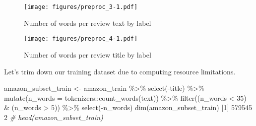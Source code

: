 \documentclass[
]{article}
\newenvironment{Shaded}{}{}
\newcommand{\AttributeTok}[1]{\textcolor[rgb]{0.49,0.56,0.16}{#1}}
\newcommand{\CommentTok}[1]{\textcolor[rgb]{0.38,0.63,0.69}{\textit{#1}}}
\newcommand{\DecValTok}[1]{\textcolor[rgb]{0.25,0.63,0.44}{#1}}
\newcommand{\FunctionTok}[1]{\textcolor[rgb]{0.02,0.16,0.49}{#1}}
\newcommand{\NormalTok}[1]{#1}
\newcommand{\OtherTok}[1]{\textcolor[rgb]{0.00,0.44,0.13}{#1}}
\newcommand{\SpecialCharTok}[1]{\textcolor[rgb]{0.25,0.44,0.63}{#1}}
\begin{document}
\begin{figure}
\centering
\texttt{[image: figures/preproc\_3-1.pdf]}
\caption{Number of words per review text by label\label{fig:model_5}}
\end{figure}

\begin{figure}
\centering
\texttt{[image: figures/preproc\_4-1.pdf]}
\caption{Number of words per review title by label\label{fig:model_6}}
\end{figure}

Let's trim down our training dataset due to computing resource
limitations.

\begin{Shaded}
\begin{Highlighting}[]
\NormalTok{amazon\_subset\_train }\OtherTok{\textless{}{-}}\NormalTok{ amazon\_train }\SpecialCharTok{\%\textgreater{}\%}
    \FunctionTok{select}\NormalTok{(}\SpecialCharTok{{-}}\NormalTok{title) }\SpecialCharTok{\%\textgreater{}\%}
    \FunctionTok{mutate}\NormalTok{(}\AttributeTok{n\_words =}\NormalTok{ tokenizers}\SpecialCharTok{::}\FunctionTok{count\_words}\NormalTok{(text)) }\SpecialCharTok{\%\textgreater{}\%}
    \FunctionTok{filter}\NormalTok{((n\_words }\SpecialCharTok{\textless{}} \DecValTok{35}\NormalTok{) }\SpecialCharTok{\&}\NormalTok{ (n\_words }\SpecialCharTok{\textgreater{}} \DecValTok{5}\NormalTok{)) }\SpecialCharTok{\%\textgreater{}\%}
    \FunctionTok{select}\NormalTok{(}\SpecialCharTok{{-}}\NormalTok{n\_words)}
\FunctionTok{dim}\NormalTok{(amazon\_subset\_train)}
\NormalTok{[}\DecValTok{1}\NormalTok{] }\DecValTok{579545}      \DecValTok{2}
\CommentTok{\# head(amazon\_subset\_train)}
\end{Highlighting}
\end{Shaded}
\end{document}
